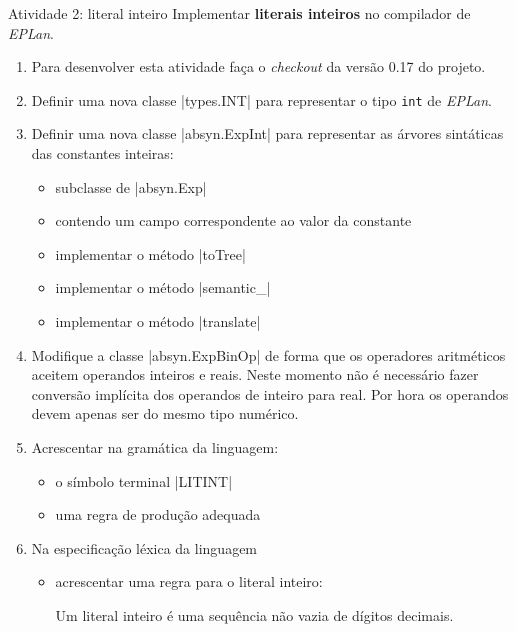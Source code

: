 \documentclass[smaller]{beamer}
\newcommand{\lang}{\textsl{EPLan}}
\begin{document}
\begin{frame}{Atividade 2: literal inteiro}
  Implementar \textbf{literais inteiros} no compilador de \lang{}.
  \begin{enumerate}
    \item Para desenvolver esta atividade faça o \emph{checkout} da
    \alert{versão 0.17} do projeto.
    
    \item Definir uma nova classe \pyginline|types.INT| para
    representar o tipo \texttt{int} de \lang{}.

    \item Definir uma nova classe \pyginline|absyn.ExpInt| para
    representar as árvores sintáticas das constantes inteiras:
    \begin{itemize}
      \item subclasse de \pyginline|absyn.Exp|
      \item contendo um campo correspondente ao valor da constante
      \item implementar o método \pyginline|toTree|
      \item implementar o método \pyginline|semantic_|
      \item implementar o método \pyginline|translate|
    \end{itemize}
    
    \item Modifique a classe \pyginline|absyn.ExpBinOp| de forma que
    os operadores aritméticos aceitem operandos inteiros e
    reais. Neste momento não é necessário fazer conversão implícita
    dos operandos de inteiro para real. Por hora os operandos devem
    apenas ser do mesmo tipo numérico.

    \item Acrescentar na gramática da linguagem:
    \begin{itemize}
      \item o símbolo terminal \pyginline|LITINT|
      \item uma regra de produção adequada
    \end{itemize}

    \item Na especificação léxica da linguagem
    \begin{itemize}
      \item acrescentar uma regra para o literal inteiro:

      Um literal inteiro é uma sequência não vazia de dígitos
      decimais.


\end{itemize}
\end{enumerate}
\end{frame}
\end{document}
